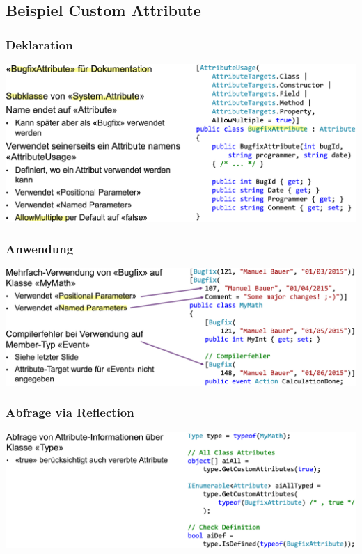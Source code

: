 \subsection{Beispiel Custom Attribute}
\subsubsection{Deklaration}
\begin{center}
    \includegraphics[scale=.35]{graphic/ref attr/deklaration.png}
\end{center}
\vspace{-8pt}

\subsubsection{Anwendung}
\begin{center}
    \includegraphics[scale=.35]{graphic/ref attr/anwendung.png}
\end{center}
\vspace{-8pt}

\subsubsection{Abfrage via Reflection}
\begin{center}
    \includegraphics[scale=.35]{graphic/ref attr/abfrage.png}
\end{center}
\vspace{-8pt}


